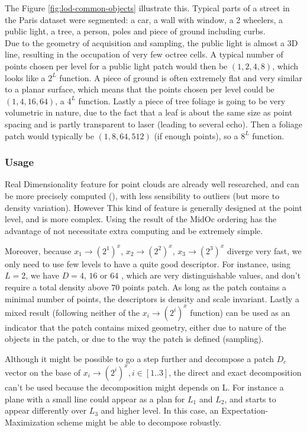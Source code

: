 		
		The Figure \ref{fig:lod-common-objects} illustrate this. Typical parts of a street in the Paris dataset were segmented: a car, a wall with window, a 2 wheelers, a public light, a tree, a person, poles and piece of ground including curbs.
		\\
		Due to the geometry of acquisition and sampling, the public light is almost a 3D line, resulting in the occupation of very few octree cells.
		A typical number of points chosen per level for a public light patch would then be $(1,2,4,8)$, which looks like a $2^L$ function.
		A piece of ground is often extremely flat and very similar to a planar surface,
		which means that the points chosen per level could be $(1,4,16,64)$, a $4^L$ function.
		Lastly a piece of tree foliage is going to be very volumetric in nature,
		due to the fact that a leaf is about the same size as point spacing and is partly transparent to laser (leading to several echo).
		Then a foliage patch would typically be $(1,8,64,512)$ (if enough points), so a $8^L$ function.
		
		\subsubsection{Usage}

		Real Dimensionality feature for point clouds are already well researched, and can be more precisely computed (\cite{Demantke2014}), with less sensibility to outliers (but more to density variation). However This kind of feature is generally designed at the point level, and is more complex.
		Using the result of the MidOc ordering has the advantage of not necessitate extra computing and be extremely simple.
		
		Moreover, because $x_1 \rightarrow (2^1)^x$,
		$x_2 \rightarrow (2^2)^x$, $x_3 \rightarrow (2^3)^x$ diverge very fast,
		we only need to use few levels to have a quite good descriptor.
		For instance, using $L=2$, we have $D=4$, $16$ or $64$ , which are very distinguishable values, and don't require a total density above $70$ points \per patch.  
		As long as the patch contains a minimal number of points, the descriptors is density and scale invariant. 
		Lastly a mixed result (following neither of the $x_i \rightarrow (2^i)^x$ function) can be used as an indicator that the patch contains mixed geometry, either due to nature of the objects in the patch, or due to the way the patch is defined (sampling).
		
		Although it might be possible to go a step further and decompose a patch $D_c$ vector on the base of $x_i \rightarrow (2^i)^x, i \in [1..3]$, the direct and exact decomposition can't be used because the decomposition might depends on L. For instance a plane with a small line could appear as a plan for $L_1$ and $L_2$, and starts to appear differently over $L_3$ and higher level. In this case, an Expectation-Maximization scheme might be able to decompose robustly.
 
